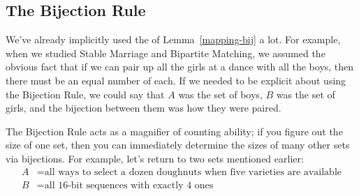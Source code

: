 \iffalse
  Assuming for simplicity that all functions
mentioned in the rest of these notes are total, we can restate these rules
as:

\begin{mathrule}[Mapping Rule] \mbox{}
\begin{enumerate}

\item If $f : X \to Y$ is surjective, then $\card{X} \geq \card{Y}$.

\item\label{in<} If $f : X \to Y$ is injective, then $\card{X} \leq \card{Y}$.

\item If $f : X \to Y$ is bijective, then $\card{X} = \card{Y}$.

\end{enumerate}
\end{mathrule}

Now let's start to put these rules to work.

, the size of a finite set, $A$, is greater
than or equal to the size of another finite set, $B$, iff there is a
surjective function, $f:A \to B$.  They have the same size iff there is a
bijection from $A$ to $B$. 

We already have a
mathematical tool for relating one set to another: relations.  Not
surprisingly, a particular kind of relation is at the heart of counting.
\fi



\subsection{The Bijection Rule}

We've already implicitly used the  of
Lemma~\ref{mapping-bij} a lot.  For example, when we studied Stable
Marriage and Bipartite Matching, we assumed the obvious fact that if we
can pair up all the girls at a dance with all the boys, then there must be
an equal number of each.  If we needed to be explicit about using the
Bijection Rule, we could say that $A$ was the set of boys, $B$ was the set
of girls, and the bijection between them was how they were paired.

The Bijection Rule acts as a magnifier of counting ability; if you
figure out the size of one set, then you can immediately determine the
sizes of many other sets via bijections.  For example, let's return to
two sets mentioned earlier:
%
\begin{align*}
A & = \text{all ways to select a dozen doughnuts when five varieties are available} \\
B & = \text{all 16-bit sequences with exactly 4 ones}
\end{align*}

